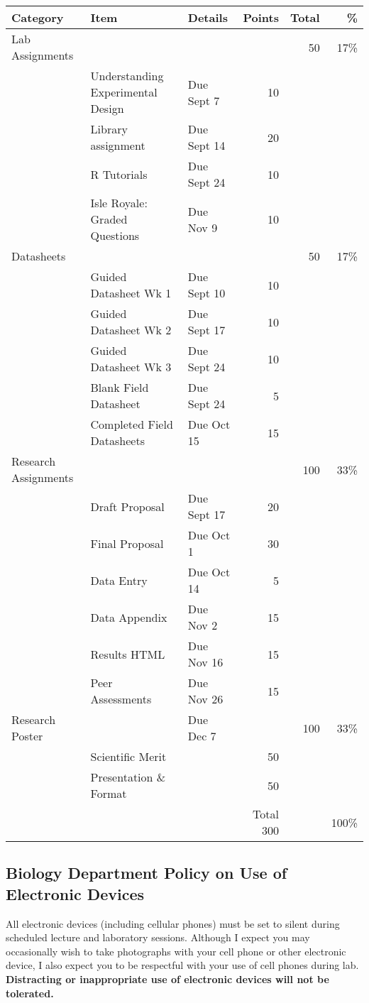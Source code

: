 \documentclass{tufte-handout}
\begin{document}
\begin{fullwidth}
\begin{table}
\begin{tabular}{l l l r r r}
Category & Item & Details & Points  & Total & \% \\
\hline
Lab Assignments & & &  & 50 & 17\% \\
& Understanding Experimental Design & Due Sept 7 &10 \\
& Library assignment & Due Sept 14 & 20 \\
& R Tutorials & Due Sept 24 & 10 \\
& Isle Royale: Graded Questions & Due Nov 9 & 10 \\
\hline
Datasheets & & &  & 50 & 17\% \\
& Guided Datasheet Wk 1 & Due Sept 10 & 10 \\
& Guided Datasheet Wk 2 & Due Sept 17 & 10 \\
& Guided Datasheet Wk 3 & Due Sept 24 & 10 \\
& Blank Field Datasheet & Due Sept 24 & 5 \\
& Completed Field Datasheets & Due Oct 15 & 15 \\
\hline
Research Assignments & & & & 100 & 33\% \\
& Draft Proposal & Due Sept 17 & 20 \\
& Final Proposal & Due Oct 1 & 30 \\
& Data Entry & Due Oct 14 & 5 \\
& Data Appendix & Due Nov 2 & 15 \\
& Results HTML & Due Nov 16 & 15 \\
& Peer Assessments & Due Nov 26 & 15 \\
\hline
Research Poster & & Due Dec 7& & 100 & 33\% \\
& Scientific Merit &  & 50 \\
&  Presentation \& Format && 50 \\
\hline 
& & & Total 300 & & 100\% \\
\end{tabular}
\end{table}

\end{fullwidth}


\subsection{Biology Department Policy on Use of Electronic Devices}

All electronic devices (including cellular phones) must be set to silent during scheduled lecture and laboratory sessions. Although I expect you may occasionally wish to take photographs with your cell phone or other electronic device, I also expect you to be respectful with your use of cell phones during lab. \textbf{Distracting or inappropriate use of electronic devices will not be tolerated.}
\end{document}
